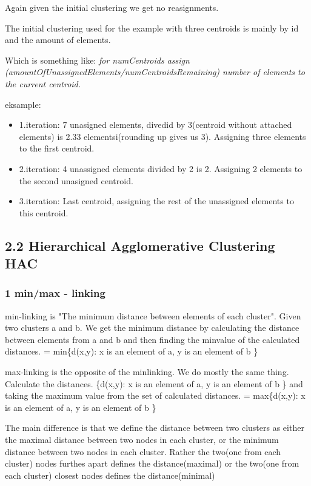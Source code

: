 \documentclass[12pt, a4paper]{article}
\begin{document}
Again given the initial clustering we get no reasignments.

The initial clustering used for the example with three centroids is mainly by id and the amount of elements.

Which is something like: 
\textit{for numCentroids assign (amountOfUnassignedElements/numCentroidsRemaining) number of elements to the current centroid.}

eksample:
\begin{itemize}
	\item 1.iteration: 7 unasigned elements, divedid by 3(centroid without attached elements) is 2.33 elementsi(rounding up gives us 3). Assigning three elements to the first centroid. 
	\item 2.iteration: 4 unassigned elements divided by 2 is 2. Assigning 2 elements to the second unasigned centroid. 
	\item 3.iteration: Last centroid, assigning the rest of the unassigned elements to this centroid. 
\end{itemize}

\subsection{2.2 Hierarchical Agglomerative Clustering HAC}
\subsubsection{1 min/max - linking}
min-linking is "The minimum distance between elements of each cluster". 
Given two clusters a and b. We get the minimum distance by calculating the distance between elements from a and b and then finding the minvalue of the calculated distances. 
= min\{d(x,y): x is an element of a, y is an element of b \}

max-linking is the opposite of the minlinking. We do mostly the same thing. Calculate the distances. \{d(x,y): x is an element of a, y is an element of b \} and taking the maximum value from the set of calculated distances. = max\{d(x,y): x is an element of a, y is an element of b \}

The main difference is that we define the distance between two clusters as either the maximal distance between two nodes in each cluster, or the minimum distance between two nodes in each cluster. Rather the two(one from each cluster) nodes furthes apart defines the distance(maximal) or the two(one from each cluster) closest nodes defines the distance(minimal)
\end{document}
